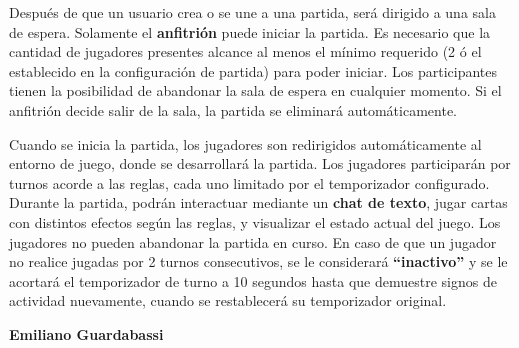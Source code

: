 \documentclass[12pt,a4paper]{article}
\begin{document}
Después de que un usuario crea o se une a una partida, será dirigido a una sala
de espera. Solamente el \textbf{anfitrión} puede iniciar la partida. Es necesario
que la cantidad de jugadores presentes alcance al menos el mínimo requerido
(2 ó el establecido en la configuración de partida) para poder iniciar. Los
participantes tienen la posibilidad de abandonar la sala de espera en cualquier 
momento. Si el anfitrión decide salir de la sala, la partida se eliminará automáticamente.

Cuando se inicia la partida, los jugadores son redirigidos automáticamente 
al entorno de juego, donde se desarrollará la partida. Los jugadores participarán
por turnos acorde a las reglas, cada uno limitado por el temporizador configurado. 
Durante la partida, podrán interactuar mediante un \textbf{chat de texto}, 
jugar cartas con distintos efectos según las reglas, y visualizar el estado 
actual del juego. Los jugadores no pueden abandonar la partida en curso. 
En caso de que un jugador no realice jugadas por 2 turnos consecutivos, se le 
considerará \textbf{``inactivo''} y se le acortará el temporizador de turno a 
10 segundos hasta que demuestre signos de actividad nuevamente, cuando se 
restablecerá su temporizador original.


\vspace{2cm}
\begin{flushright}
\textbf{Emiliano Guardabassi}
\end{flushright}
\end{document}
